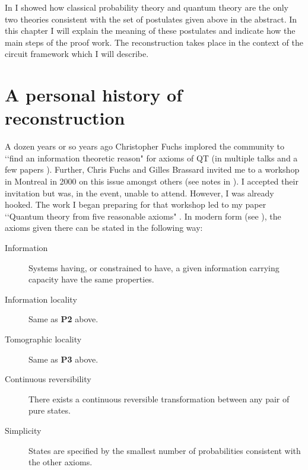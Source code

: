 \documentclass[10pt]{article}
\begin{document}
In \cite{hardy2011reformulating} I showed how classical probability theory and quantum theory are the only two theories consistent with the  set of postulates given above in the abstract. In this chapter I will explain the meaning of these postulates and indicate how the main steps of the proof work.  The reconstruction takes place in the context of the circuit framework which I will describe.



\section{A personal history of reconstruction}


A dozen years or so years ago Christopher Fuchs implored the community to \lq\lq find an information theoretic reason" for axioms of QT (in multiple talks and a few papers \cite{fuchs2001quantum, fuchs2002quantum}).  Further, Chris Fuchs and Gilles Brassard invited me to a workshop in Montreal in 2000 on this issue amongst others (see notes in \cite{fuchs2009coming}).  I accepted their invitation but was, in the event, unable to attend. However, I was already hooked.  The work I began preparing for that workshop led to my paper \lq\lq Quantum theory from five reasonable axioms" \cite{hardy2001quantum}.   In modern form (see \cite{hardy2009foliable}), the axioms given there can be stated in the following way:
\begin{description}
\item[Information] Systems having, or constrained to have, a given information carrying
capacity have the same properties.
\item[Information locality] Same as {\bf P2} above.
\item[Tomographic locality] Same as {\bf P3} above.
\item[Continuous reversibility] There exists a continuous reversible transformation between any
pair of pure states.
\item[Simplicity] States are specified by the smallest number of probabilities consistent
with the other axioms.
\end{description}
\end{document}
